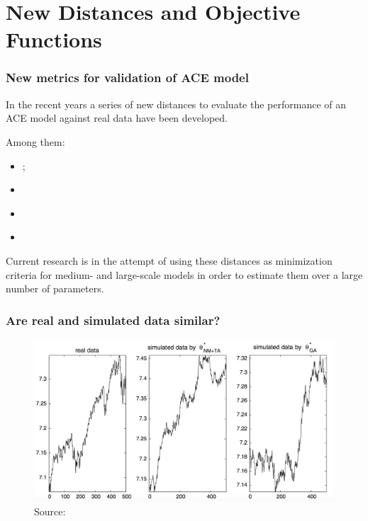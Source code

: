 \documentclass[10pt]{beamer}
\begin{document}
\section{New Distances and Objective Functions}
\label{sec:new_objectives}


\begin{frame}[c]\frametitle{New metrics for validation of ACE model}
	In the recent years a series of new distances to evaluate the performance of an ACE model against real data have been developed. \bigskip

	Among them:
	\begin{itemize}
		\item \citet{marks2013validation};
		\item \citet{barde2017practical,barde2020comparison}
		\item \citet{lamperti2018gsl}
		\item \citet{guerini2017validation}
	\end{itemize} \bigskip

	Current research is in the attempt of using these distances as minimization criteria for medium- and large-scale models in order to estimate them over a large number of parameters.
\end{frame}

\begin{frame}[c]\frametitle{Are real and simulated data similar?}
	\begin{figure} \centering
	\includegraphics[scale=0.3]{figures/fabbretti_2003_timeseries.png}\\
	Source: \cite{fabretti2013problem}
	\end{figure}
\end{frame}
\end{document}
